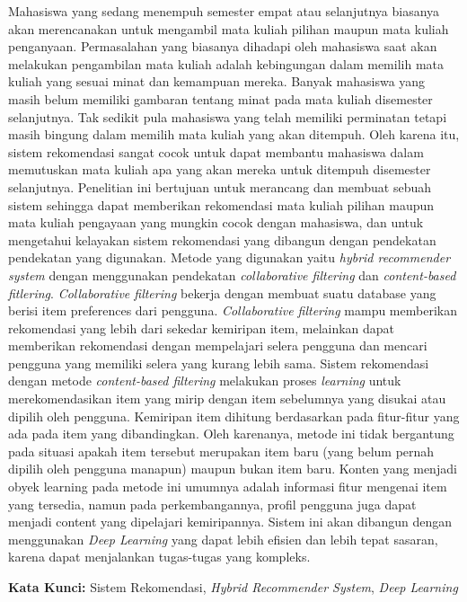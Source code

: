 {Mahasiswa yang sedang menempuh semester empat atau selanjutnya biasanya akan merencanakan untuk mengambil mata kuliah pilihan maupun mata kuliah penganyaan.
Permasalahan yang biasanya dihadapi oleh mahasiswa saat akan melakukan pengambilan mata kuliah adalah kebingungan dalam memilih mata kuliah yang sesuai minat dan kemampuan
mereka. Banyak mahasiswa yang masih belum memiliki gambaran tentang minat pada mata kuliah disemester selanjutnya. Tak sedikit pula mahasiswa yang telah memiliki
perminatan tetapi masih bingung dalam memilih mata kuliah yang akan ditempuh. Oleh karena itu, sistem rekomendasi sangat cocok untuk dapat membantu
mahasiswa dalam memutuskan mata kuliah apa yang akan mereka untuk ditempuh disemester selanjutnya. Penelitian ini bertujuan untuk merancang dan membuat
sebuah sistem sehingga dapat memberikan rekomendasi mata kuliah pilihan maupun mata kuliah pengayaan yang mungkin cocok dengan mahasiswa, dan untuk
mengetahui kelayakan sistem rekomendasi yang dibangun dengan pendekatan pendekatan yang digunakan. Metode yang digunakan yaitu \emph{hybrid recommender system} dengan
menggunakan pendekatan \emph{collaborative filtering} dan \emph{content-based fitlering}. \emph{Collaborative filtering} bekerja dengan membuat suatu database yang berisi item preferences
dari pengguna. \emph{Collaborative filtering} mampu memberikan rekomendasi yang lebih dari sekedar kemiripan item, melainkan dapat memberikan rekomendasi dengan mempelajari selera pengguna dan
mencari pengguna yang memiliki selera yang kurang lebih sama. Sistem rekomendasi dengan metode \emph{content-based filtering} melakukan proses \emph{learning} untuk merekomendasikan
item yang mirip dengan item sebelumnya yang disukai atau dipilih oleh pengguna. Kemiripan item dihitung berdasarkan pada fitur-fitur yang ada pada item yang dibandingkan.
Oleh karenanya, metode ini tidak bergantung pada situasi apakah item tersebut merupakan item baru (yang belum pernah dipilih oleh pengguna manapun) maupun bukan item baru. Konten yang
menjadi obyek learning pada metode ini umumnya adalah informasi fitur mengenai item yang tersedia, namun pada perkembangannya, profil pengguna juga dapat menjadi content yang dipelajari
kemiripannya. Sistem ini akan dibangun dengan menggunakan \emph{Deep Learning} yang dapat lebih efisien dan lebih tepat sasaran, karena dapat menjalankan tugas-tugas yang kompleks.

\vspace{6 mm}
\noindent
\textbf{Kata Kunci: }Sistem Rekomendasi, \emph{Hybrid Recommender System}, \emph{Deep Learning}
}